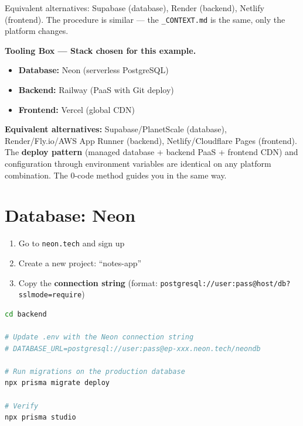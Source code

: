 \begin{tipbox}
Equivalent alternatives: Supabase (database), Render (backend), Netlify (frontend). The procedure is similar --- the \texttt{\_CONTEXT.md} is the same, only the platform changes.
\end{tipbox}
\begin{notebox}
\textbf{Tooling Box --- Stack chosen for this example.}
\begin{itemize}
  \item \textbf{Database:} Neon (serverless PostgreSQL)
  \item \textbf{Backend:} Railway (PaaS with Git deploy)
  \item \textbf{Frontend:} Vercel (global CDN)
\end{itemize}
\textbf{Equivalent alternatives:} Supabase/PlanetScale (database), Render/Fly.io/AWS App Runner (backend), Netlify/Cloudflare Pages (frontend). The \textbf{deploy pattern} (managed database + backend PaaS + frontend CDN) and configuration through environment variables are identical on any platform combination. The 0-code method guides you in the same way.
\end{notebox}
\section{Database: Neon}

\begin{praticabox}[title={Practice --- Neon setup}]
\begin{enumerate}
  \item Go to \texttt{neon.tech} and sign up
  \item Create a new project: ``notes-app''
  \item Copy the \textbf{connection string} (format: \texttt{postgresql://user:pass@host/db?sslmode=require})
\end{enumerate}
\end{praticabox}

\begin{praticabox}[title={Practice --- Migrate the schema}]
\begin{lstlisting}[language=bash]
cd backend

# Update .env with the Neon connection string
# DATABASE_URL=postgresql://user:pass@ep-xxx.neon.tech/neondb

# Run migrations on the production database
npx prisma migrate deploy

# Verify
npx prisma studio
\end{lstlisting}
\end{praticabox}

